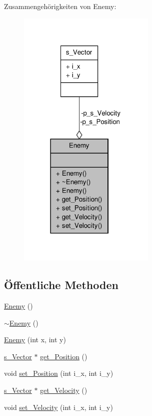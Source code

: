 Zusammengehörigkeiten von Enemy\-:
\nopagebreak
\begin{figure}[H]
\begin{center}
\leavevmode
\includegraphics[width=186pt]{class_enemy__coll__graph}
\end{center}
\end{figure}
\subsection*{Öffentliche Methoden}
\begin{DoxyCompactItemize}
\item 
\hyperlink{class_enemy_a94f30d348b6d2840fd71675472ba38dd}{Enemy} ()
\item 
\hyperlink{class_enemy_ac0eec4755e28c02688065f9657150ac3}{$\sim$\-Enemy} ()
\item 
\hyperlink{class_enemy_a98f0d2110309536798101b88d2d1d8c9}{Enemy} (int x, int y)
\item 
\hyperlink{structs___vector}{s\-\_\-\-Vector} $\ast$ \hyperlink{class_enemy_a8894742ec191ae32c4e22014e5af8246}{get\-\_\-\-Position} ()
\item 
void \hyperlink{class_enemy_a39b8b0f9a87bf2a7b6ee8a1f59cefcf4}{set\-\_\-\-Position} (int i\-\_\-x, int i\-\_\-y)
\item 
\hyperlink{structs___vector}{s\-\_\-\-Vector} $\ast$ \hyperlink{class_enemy_a01024ba4588c4ab2efc9a9e0a960c983}{get\-\_\-\-Velocity} ()
\item 
void \hyperlink{class_enemy_ab026b4302720f1676653285b27babd59}{set\-\_\-\-Velocity} (int i\-\_\-x, int i\-\_\-y)
\end{DoxyCompactItemize}
